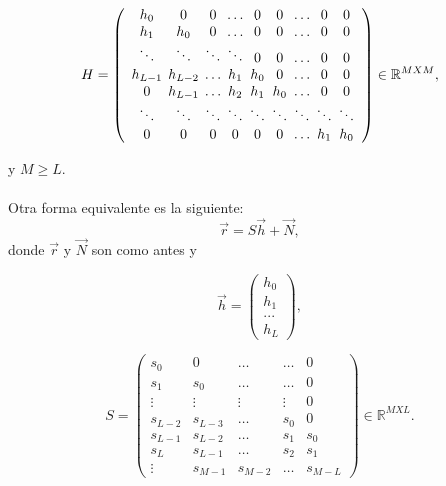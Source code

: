 \documentclass[10pt,journal,compsoc]{IEEEtran}
\begin{document}
\begin{equation}
H = \left(
\begin{array}{c@{\hspace{1ex}} c@{\hspace{1ex}} c@{\hspace{1ex}} c@{\hspace{1ex}} c@{\hspace{1ex}} c@{\hspace{1ex}} c@{\hspace{1ex}} c@{\hspace{1ex}} c}
h_{0} & 0 & 0 & \ldots & 0 & 0 & \ldots & 0 & 0\\ 
h_1 & h_0 &0&\ldots&0&0&\ldots&0&0 \\
\ddots & \ddots & \ddots & \ddots &0&0& \ldots&0&0\\
h_{L-1} &h_{L-2} &   \ldots & h_{1} & h_{0} &0 & \ldots & 0 & 0\\
0 &h_{L-1} &  \ldots & h_{2} & h_{1} & h_{0} & \ldots & 0 & 0 \\
\ddots&\ddots&\ddots&\ddots&\ddots&\ddots&\ddots&\ddots & \ddots \\ 
0&0&0&0&0&0&\ldots&h_1 & h_0
\end{array}
\right)  \in \mathbb{R}^{M X M},
\end{equation}

y $M \geq L$. \\ \\
Otra forma equivalente es la siguiente:
\begin{equation}
\vec{r} = S\vec{h}+\vec{N},
\end{equation}
donde $\vec{r}$ y $\vec{N}$ son como antes y

\begin{equation}
\vec{h} = \left(
\begin{array}{c}
h_0\\ h_1\\ ...\\h_L
\end{array}
\right),
\end{equation}

\begin{equation}
S = \left(
\begin{array}{ccccccccc}
s_{0} & 0 & \ldots & \ldots & 0\\ 
s_{1} & s_{0} &\ldots & \ldots & 0\\
\vdots & \vdots & \vdots & \vdots &0\\
s_{L-2} &s_{L-3} &\ldots & s_{0} &0 \\
s_{L-1} &s_{L-2} &\ldots & s_{1} & s_{0} \\
s_{L} & s_{L-1} & \ldots &  s_{2} & s_{1}  \\
\vdots & s_{M-1}& s_{M-2} & \ldots & s_{M-L}
\end{array}
\right) \in \mathbb{R}^{M X L}.
\end{equation}
\end{document}
